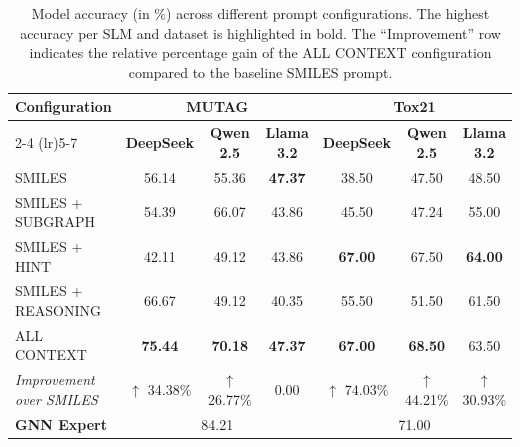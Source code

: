 \documentclass[
]{ceurart}
\begin{document}
\begin{table}[htbp]
\centering
\caption{Model accuracy (in \%) across different prompt configurations.  The highest accuracy per SLM and dataset is highlighted in bold. The ``Improvement'' row indicates the relative percentage gain of the ALL CONTEXT configuration compared to the baseline SMILES prompt.}
\label{tab:main}
\begin{tabular}{lcccccc}
\toprule
\multirow{2}{*}{\textbf{Configuration}} & \multicolumn{3}{c}{\textbf{MUTAG}} & \multicolumn{3}{c}{\textbf{Tox21}} \\
\cmidrule(lr){2-4} \cmidrule(lr){5-7}
& \textbf{DeepSeek} & \textbf{Qwen 2.5} & \textbf{Llama 3.2} & \textbf{DeepSeek} & \textbf{Qwen 2.5} & \textbf{Llama 3.2} \\
\midrule
SMILES              & 56.14 & 55.36 & \textbf{47.37} & 38.50 & 47.50 & 48.50 \\
SMILES + SUBGRAPH   & 54.39 & 66.07 & 43.86 & 45.50 & 47.24 & 55.00 \\
SMILES + HINT       & 42.11 & 49.12 & 43.86 & \textbf{67.00} & 67.50 & \textbf{64.00} \\
SMILES + REASONING  & 66.67 & 49.12 & 40.35 & 55.50 & 51.50 & 61.50 \\
ALL CONTEXT         & \textbf{75.44} & \textbf{70.18} & \textbf{47.37} & \textbf{67.00} & \textbf{68.50} & 63.50 \\
\midrule
\textit{Improvement over SMILES} & \textcolor{green!60!black}{$\uparrow$ 34.38\%} & \textcolor{green!60!black}{$\uparrow$ 26.77\%} & 0.00 & \textcolor{green!60!black}{$\uparrow$ 74.03\%} & \textcolor{green!60!black}{$\uparrow$ 44.21\%} & \textcolor{green!60!black}{$\uparrow$ 30.93\%} \\
\midrule
\textbf{GNN Expert} & \multicolumn{3}{c}{84.21} & \multicolumn{3}{c}{71.00} \\
\bottomrule
\end{tabular}
\end{table}
\end{document}
